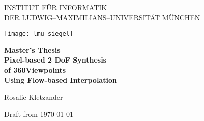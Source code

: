 \let\textacute\'

\thispagestyle{empty}

\begin{center}

\vspace*{-2cm}

{\Huge INSTITUT FÜR INFORMATIK\\[1mm]}
DER LUDWIG--MAXIMILIANS--UNIVERSITÄT MÜNCHEN\\

\vspace*{1cm}

\texttt{[image: lmu\_siegel]}

\vspace*{2cm}

{\Large \textbf{Master's Thesis}}\\ %

\vspace{2.0cm}
{\Huge \textbf{Pixel-based 2 DoF Synthesis}}\\
\vspace*{3mm}
{\Huge \textbf{of 360\degree Viewpoints}}\\
\vspace*{3mm}
{\Huge \textbf{Using Flow-based Interpolation}}\\
\vspace{1.5cm}

{\LARGE Rosalie Kletzander} %

\vspace{3cm}
Draft from \today %

\end{center}

\newpage


\thispagestyle{empty}
\cleardoublepage


\thispagestyle{empty}

